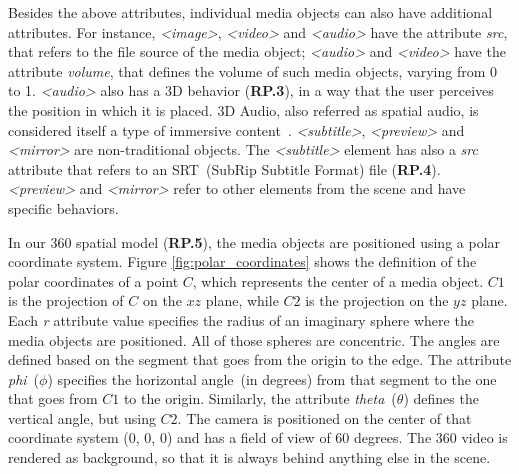 Besides the above attributes, individual media objects can also have
additional attributes.
For instance, \emph{<image>}, \emph{<video>} and \emph{<audio>} have the
attribute \emph{src}, that refers to the file source of the media object;
 \emph{<audio>} and \emph{<video>} have the attribute \emph{volume}, that
defines the volume of such media objects, varying from 0 to 1.
\textit{<audio>} also has a 3D behavior (\textbf{RP.3}), in a way that the
user perceives the position in which it is placed.
3D Audio, also referred as spatial audio, is considered itself a type of immersive content~\cite{hughes_disruptive_2019}.
\emph{<subtitle>}, \emph{<preview>} and \emph{<mirror>} are non-traditional
objects.
The \emph{<subtitle>} element has also a \emph{src} attribute that refers to an
SRT~(SubRip Subtitle Format) file (\textbf{RP.4}).
\emph{<preview>} and \emph{<mirror>} refer to other elements from the scene
and have specific behaviors.

In our 360 spatial model (\textbf{RP.5}), the media objects are positioned
using a polar coordinate system.
Figure \ref{fig:polar_coordinates} shows the definition of the polar
coordinates of a point $C$, which represents the center of a media object.
$C1$ is the projection of $C$ on the $xz$ plane, while $C2$ is the projection
on the $yz$ plane.
Each \emph{r} attribute value specifies the radius of an imaginary sphere
where the media objects are positioned.
All of those spheres are concentric.
The angles are defined based on the segment that goes from the origin to the
edge.
The attribute \emph{phi}~($\phi$) specifies the horizontal angle~(in degrees)
from that segment to the one that goes from $C1$ to the origin.
Similarly, the attribute \emph{theta}~($\theta$) defines the vertical angle, but using $C2$. 
The camera is positioned on the center of that coordinate system ($0$, $0$, $0$) and has a field of view of 60 degrees.
The 360 video is rendered as background, so that it is always behind anything else in the scene.

